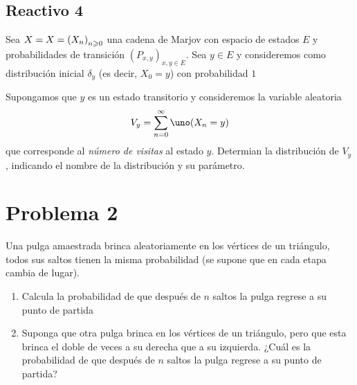 \documentclass[a4paper,12pt]{article}
\begin{document}
\subsection{Reactivo 4}
\begin{displayquote}
    Sea $X=X=\cdm[n][0]{X_n}$ una cadena de Marjov con espacio de estados $E$ y probabilidades de transición $(P_{x,y})_{x,y\in E}$. Sea $y\in E$ y consideremos como distribución inicial $\delta_y$ (es decir, $X_0=y$) con probabilidad $1$
    \par Supongamos que $y$ es un estado transitorio y consideremos la variable aleatoria
    \[V_y=\sum_{n=0}^\infty\uno(X_n=y)\]
    que corresponde al \textit{número de visitas} al estado $y$. Determian la distribución de $V_y$, indicando el nombre de la distribución y su parámetro.
\end{displayquote}
\section{Problema 2}
\begin{displayquote}
    Una pulga amaestrada brinca aleatoriamente en los vértices de un triángulo, todos sus saltos tienen la misma probabilidad (se supone que en cada etapa cambia de lugar).
    \begin{enumerate}
        \item Calcula la probabilidad de que después de $n$ saltos la pulga regrese a su punto de partida
        \item Suponga que otra pulga brinca en los vértices de un triángulo, pero que esta brinca el doble de veces a su derecha que a su izquierda. ¿Cuál es la probabilidad de que después de $n$ saltos la pulga regrese a su punto de partida?
    \end{enumerate}
\end{displayquote}
\end{document}
